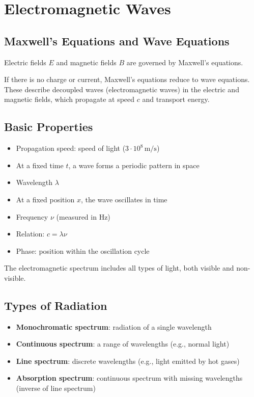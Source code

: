 \documentclass{article}
\begin{document}
\section{Electromagnetic Waves}

\subsection{Maxwell's Equations and Wave Equations}
Electric fields $E$ and magnetic fields $B$ are governed by Maxwell's equations.

If there is no charge or current, Maxwell's equations reduce to wave equations. These describe decoupled waves (electromagnetic waves) in the electric and magnetic fields, which propagate at speed $c$ and transport energy.

\subsection{Basic Properties}
\begin{itemize}
  \item Propagation speed: speed of light ($3 \cdot 10^8 \,\text{m/s}$)
  \item At a fixed time $t$, a wave forms a periodic pattern in space
  \item Wavelength $\lambda$
  \item At a fixed position $x$, the wave oscillates in time
  \item Frequency $\nu$ (measured in Hz)
  \item Relation: $c = \lambda \nu$
  \item Phase: position within the oscillation cycle
\end{itemize}

The electromagnetic spectrum includes all types of light, both visible and non-visible.

\subsection{Types of Radiation}
\begin{itemize}
  \item \textbf{Monochromatic spectrum}: radiation of a single wavelength
  \item \textbf{Continuous spectrum}: a range of wavelengths (e.g., normal light)
  \item \textbf{Line spectrum}: discrete wavelengths (e.g., light emitted by hot gases)
  \item \textbf{Absorption spectrum}: continuous spectrum with missing wavelengths (inverse of line spectrum)
\end{itemize}
\end{document}

